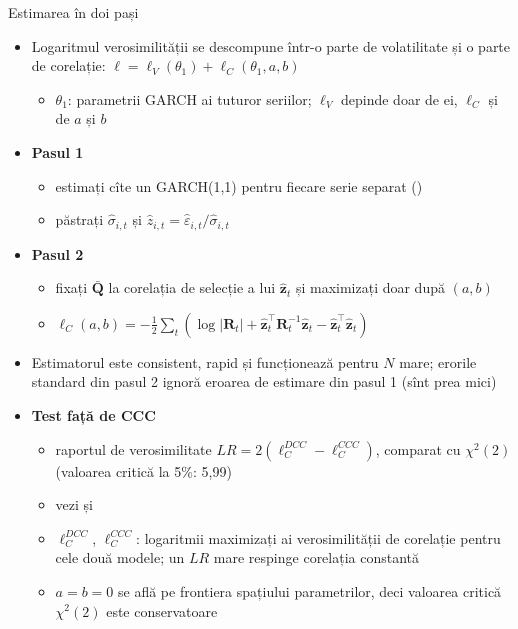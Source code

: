 \begin{frame}{Estimarea în doi pași}
\itemsize{\footnotesize}
\begin{itemize}
    \item Logaritmul verosimilității se descompune într-o parte de volatilitate și o parte de corelație: $\ell = \ell_V(\theta_1) + \ell_C(\theta_1, a, b)$
    \begin{itemize}
        \item $\theta_1$: parametrii GARCH ai tuturor seriilor; $\ell_V$ depinde doar de ei, $\ell_C$ și de $a$ și $b$
    \end{itemize}
    \item \textbf{Pasul 1}
    \begin{itemize}
        \item estimați cîte un GARCH(1,1) pentru fiecare serie separat ()
        \item păstrați $\hat\sigma_{i,t}$ și $\hat z_{i,t} = \hat\varepsilon_{i,t}/\hat\sigma_{i,t}$
    \end{itemize}
    \item \textbf{Pasul 2}
    \begin{itemize}
        \item fixați $\bar{\mathbf{Q}}$ la corelația de selecție a lui $\hat{\mathbf{z}}_t$ și maximizați doar după $(a, b)$
        \item $\ell_C(a, b) = -\frac12\sum_t\left(\log|\mathbf{R}_t| + \hat{\mathbf{z}}_t^\top\mathbf{R}_t^{-1}\hat{\mathbf{z}}_t - \hat{\mathbf{z}}_t^\top\hat{\mathbf{z}}_t\right)$
    \end{itemize}
    \item Estimatorul este consistent, rapid și funcționează pentru $N$ mare; erorile standard din pasul 2 ignoră eroarea de estimare din pasul 1 (sînt prea mici)
    \item \textbf{Test față de CCC}
    \begin{itemize}
        \item raportul de verosimilitate $LR = 2(\ell_C^{DCC} - \ell_C^{CCC})$, comparat cu $\chi^2(2)$ (valoarea critică la 5\%: 5{,}99)
        \item vezi și 
        \item $\ell_C^{DCC}$, $\ell_C^{CCC}$: logaritmii maximizați ai verosimilității de corelație pentru cele două modele; un $LR$ mare respinge corelația constantă
        \item $a = b = 0$ se află pe frontiera spațiului parametrilor, deci valoarea critică $\chi^2(2)$ este conservatoare
    \end{itemize}
\end{itemize}
\end{frame}

